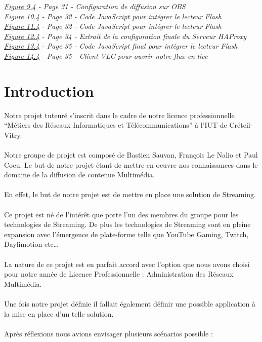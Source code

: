 \documentclass{report}
\begin{document}
\textit{\underline{Figure 9.4} - Page 31 - Configuration de diffusion sur OBS}
\\

\textit{\underline{Figure 10.4} - Page 32 - Code JavaScript pour intégrer le lecteur Flash}
\\

\textit{\underline{Figure 11.4} - Page 32 - Code JavaScript pour intégrer le lecteur Flash}
\\

\textit{\underline{Figure 12.4} - Page 34 - Extrait de la configuration finale du Serveur HAProxy}
\\

\textit{\underline{Figure 13.4} - Page 35 - Code JavaScript final pour intégrer le lecteur Flash}
\\

\textit{\underline{Figure 14.4} - Page 35 - Client VLC pour ouvrir notre flux en live}
\\







\tableofcontents

\chapter{Introduction}

Notre projet tuteuré s’inscrit dans le cadre de notre licence professionnelle “Métiers des Réseaux Informatiques et Télécommunications” à l’IUT de Créteil-Vitry.
\\
\\
Notre groupe de projet est composé de Bastien Sauvan, François Le Nalio et Paul Cocu. Le but de notre projet étant de mettre en oeuvre nos connaissances dans le domaine de la diffusion de contenue Multimédia.
\\
\\
En effet, le but de notre projet est de mettre en place une solution de Streaming.
\\
\\
Ce projet est né de l'intérêt que porte l’un des membres du groupe pour les technologies de Streaming. De plus les technologies de Streaming sont en pleine expansion avec l'émergence de plate-forme telle que YouTube Gaming, Twitch, Daylimotion etc…
\\
\\
La nature de ce projet est en parfait accord avec l'option que nous avons choisi pour notre année de Licence Professionnelle : Administration des Réseaux Multimédia.
\\
\\
Une fois notre projet définie il fallait également définir une possible application à la mise en place d'un telle solution.
\\
\\
Après réflexions nous avions envisager plusieurs scénarios possible : 
\\
\end{document}
